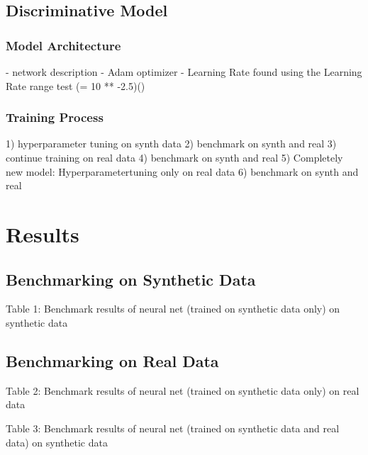 \documentclass[11pt]{article}
\begin{document}
\subsection{Discriminative Model}
\subsubsection{Model Architecture}
- network description
- Adam optimizer
- Learning Rate found using the Learning Rate range test (= 10 ** -2.5)(\cite{smith2018disciplined})


	
 	

\subsubsection{Training Process}
1) hyperparameter tuning on synth data
2) benchmark on synth and real
3) continue training on real data
4) benchmark on synth and real
5) Completely new model: Hyperparametertuning only on real data
6) benchmark on synth and real

\section{Results}
\subsection{Benchmarking on Synthetic Data}

\begin{center}
	
\begin{center}
Table 1: Benchmark results of neural net (trained on synthetic data only) on synthetic data
\end{center}


\subsection{Benchmarking on Real Data}

\begin{center}

\end{center}
\begin{center}
Table 2: Benchmark results of neural net (trained on synthetic data only) on real data
\end{center}



\begin{center}

\end{center}
Table 3: Benchmark results of neural net (trained on synthetic data and real data) on synthetic data
\end{center}
\end{document}
